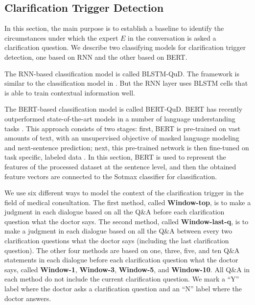 \subsection{Clarification Trigger Detection}
\label{sec:trigger}
In this section, the main purpose is to establish a baseline to identify the circumstances under which the expert $E$ in the conversation is asked a clarification question. We describe two classifying models for clarification trigger detection, one based on RNN and the other based on BERT.

The RNN-based classification model is called BLSTM-QuD. The framework is similar to the classification model in . But the RNN layer uses BLSTM cells that is able to train contextual information well.

The BERT-based classification model is called BERT-QuD. BERT has recently outperformed state-of-the-art models in a number of language understanding tasks \citep{DBLP:conf/naacl/DevlinCLT19}. This approach consists of two stages: first, BERT is pre-trained on vast amounts of text, with an unsupervised objective of masked language modeling and next-sentence prediction; next, this pre-trained network is then fine-tuned on task specific, labeled data \citep{DBLP:journals/corr/abs-1904-08398}. In this section, BERT is used to represent the features of the processed dataset at the sentence level, and then the obtained feature vectors are connected to the Sotmax classifier for classification. 

We use six different ways to model the context of the clarification trigger in the field of medical consultation.
The first method, called \textbf{Window-top}, is to make a judgment in each dialogue based on all the Q$\&$A before each clarification question what the doctor says. The second method, called \textbf{Window-last-q}, is to make a judgment in each dialogue based on all the Q$\&$A between every two clarification questions what the doctor says (including the last clarification question). The other four methods are based on one, three, five, and ten Q$\&$A statements in each dialogue before each clarification question what the doctor says, called \textbf{Window-1}, \textbf{Window-3}, \textbf{Window-5}, and \textbf{Window-10}. All Q$\&$A in each method do not include the current clarification question. We mark a ``Y'' label where the doctor asks a clarification question and an ``N'' label where the doctor answers.

